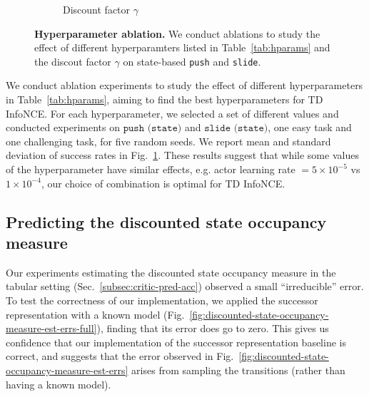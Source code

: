 \documentclass{article} %
\begin{document}
\begin{figure}[t]
\begin{subfigure}[c]{0.49\textwidth}
        \caption{Discount factor $\gamma$}
    \end{subfigure}
    \caption{ \textbf{Hyperparameter ablation.} We conduct ablations to study the effect of different hyperparamters listed in Table~\ref{tab:hparams} and the discout factor $\gamma$ on state-based \texttt{push} and \texttt{slide}.
    }
    \label{fig:hyperparam-ablation}
\end{figure}

We conduct ablation experiments to study the effect of different hyperparameters in Table~\ref{tab:hparams}, aiming to find the best hyperparameters for TD InfoNCE. For each hyperparameter, we selected a set of different values and conducted experiments on $\texttt{push (state)}$ and $\texttt{slide (state)}$, one easy task and one challenging task, for five random seeds. We report mean and standard deviation of success rates in Fig.~\ref{fig:hyperparam-ablation}. These results suggest that while some values of the hyperparameter have similar effects, e.g. actor learning rate $ = 5 \times 10^{-5}$ vs $1 \times 10^{-4}$, our choice of combination is optimal for TD InfoNCE.


\subsection{Predicting the discounted state occupancy measure}
\label{appendix:critic-pred-acc-full}

Our experiments estimating the discounted state occupancy measure in the tabular setting (Sec.~\ref{subsec:critic-pred-acc}) observed a small ``irreducible'' error. To test the correctness of our implementation, we applied the successor representation with a known model (Fig.~\ref{fig:discounted-state-occupancy-measure-est-errs-full}), finding that its error does go to zero. This gives us confidence that our implementation of the successor representation baseline is correct, and suggests that the error observed in Fig.~\ref{fig:discounted-state-occupancy-measure-est-errs} arises from sampling the transitions (rather than having a known model).
\end{document}
